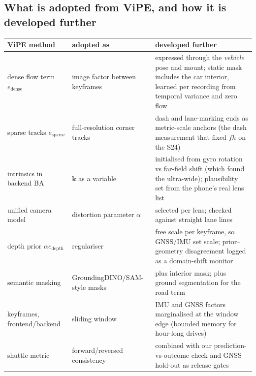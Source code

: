 \documentclass[10pt,a4paper]{article}
\begin{document}
\subsection{What is adopted from ViPE, and how it is developed further}
\begin{table}[H]
\centering\small
\begin{tabularx}{\textwidth}{@{}p{3.2cm}LL@{}}
\toprule
ViPE method & adopted as & developed further \\
\midrule
dense flow term $e_\text{dense}$ & image factor between keyframes & expressed through the \emph{vehicle} pose and mount; static mask includes the car interior, learned per recording from temporal variance and zero flow \\
sparse tracks $e_\text{sparse}$ & full-resolution corner tracks & dash and lane-marking ends as metric-scale anchors (the dash measurement that fixed $fh$ on the S24) \\
intrinsics in backend BA & $\bm k$ as a variable & initialised from gyro rotation vs far-field shift (which found the ultra-wide); plausibility set from the phone's real lens list \\
unified camera model & distortion parameter $\alpha$ & selected per lens; checked against straight lane lines \\
depth prior $\alpha e_\text{depth}$ & regulariser & free scale per keyframe, so GNSS/IMU set scale; prior--geometry disagreement logged as a domain-shift monitor \\
semantic masking & GroundingDINO/SAM-style masks & plus interior mask; plus ground segmentation for the road term \\
keyframes, frontend/backend & sliding window & IMU and GNSS factors marginalised at the window edge (bounded memory for hour-long drives) \\
shuttle metric & forward/reversed consistency & combined with our prediction-vs-outcome check and GNSS hold-out as release gates \\
\bottomrule
\end{tabularx}
\end{table}
\end{document}
